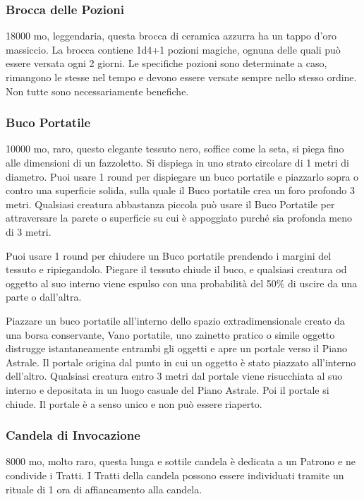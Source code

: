 \begin{multicols}{2}
	\subsubsection*{Brocca delle Pozioni}
	18000 mo, leggendaria, questa brocca di ceramica azzurra ha un tappo d’oro massiccio. La brocca contiene 1d4+1 pozioni magiche, ognuna delle quali può essere versata ogni 2 giorni. Le specifiche pozioni sono determinate a caso, rimangono le stesse nel tempo e devono essere versate sempre nello stesso ordine. Non tutte sono necessariamente benefiche.

	\subsubsection*{Buco Portatile}
	10000 mo, raro, questo elegante tessuto nero, soffice come la seta, si piega fino alle dimensioni di un fazzoletto. Si dispiega in uno strato circolare di 1 metri di diametro. Puoi usare 1 round per dispiegare un buco portatile e piazzarlo sopra o contro una superficie solida, sulla quale il Buco portatile crea un foro profondo 3 metri. Qualsiasi creatura abbastanza piccola può usare il Buco Portatile per attraversare la parete o superficie su cui è appoggiato purché sia profonda meno di 3 metri.

	Puoi usare 1 round per chiudere un Buco portatile prendendo i margini del tessuto e ripiegandolo. Piegare il tessuto chiude il buco, e qualsiasi creatura od oggetto al suo interno viene espulso con una probabilità del 50\% di uscire da una parte o dall'altra.

	Piazzare un buco portatile all'interno dello spazio extradimensionale creato da una borsa conservante, Vano portatile, uno zainetto pratico o simile oggetto distrugge istantaneamente entrambi gli oggetti e apre un portale verso il Piano Astrale. Il portale origina dal punto in cui un oggetto è stato piazzato all'interno dell'altro. Qualsiasi creatura entro 3 metri dal portale viene risucchiata al suo interno e depositata in un luogo casuale del Piano Astrale. Poi il portale si chiude. Il portale è a senso unico e non può essere riaperto.

	\subsubsection*{Candela di Invocazione}
	8000 mo, molto raro, questa lunga e sottile candela è dedicata a un Patrono e ne condivide i Tratti. I Tratti della candela possono essere individuati tramite un rituale di 1 ora di affiancamento alla candela.


\end{multicols}
